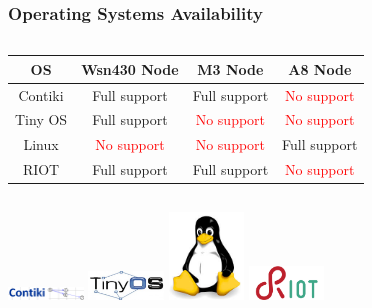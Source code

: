 \documentclass{beamer}
\begin{document}
\begin{frame}
	\frametitle{Operating Systems Availability}
	\begin{columns}[c]
		\begin{column}{30cm}
			\hspace{0.9cm}
			\begin{tabular}{| c | c | c | c |}
				\hline
				OS & Wsn430 Node & M3 Node & A8 Node \\ \hline
				Contiki & \textcolor{TextGreen}{Full support} &
				\textcolor{TextGreen}{Full support} &
				\textcolor{red}{No support} \\ \hline
				Tiny OS & \textcolor{TextGreen}{Full support} &
				\textcolor{red}{No support} &
				\textcolor{red}{No support} \\ \hline
				Linux & \textcolor{red}{No support} &
				\textcolor{red}{No support} &
				\textcolor{TextGreen}{Full support} \\ \hline
				RIOT & \textcolor{TextGreen}{Full support} &
				\textcolor{TextGreen}{Full support} &
				\textcolor{red}{No support} \\ \hline
			\end{tabular}
		\end{column}
	\end{columns}
	\vspace{.5cm}
	\hspace*{1cm}
	\includegraphics[width=2cm]{figs/contiki-logo.png}
	\hspace*{.5cm}
	\includegraphics[width=2cm]{figs/tinyos-logo.jpg}
	\hspace*{.5cm}
	\includegraphics[width=2cm]{figs/linux-logo.jpeg}
	\hspace*{.5cm}
	\includegraphics[width=2cm]{figs/riot-logo.png}
\end{frame}
\end{document}
